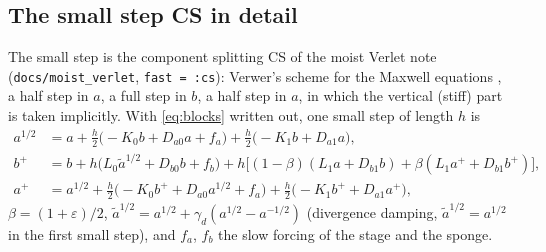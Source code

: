 \documentclass[11pt,a4paper]{article}
\newcommand{\code}[1]{\texttt{#1}}
\begin{document}
\subsection{The small step CS in detail}\label{sec:csdetail}
The small step is the component splitting CS of the moist Verlet note (\code{docs/moist\_verlet}, \code{fast = :cs}):
Verwer's scheme for the Maxwell equations \cite{verwer}, a half step in $a$, a full step in $b$, a half step in $a$, in
which the vertical (stiff) part is taken implicitly. With \eqref{eq:blocks} written out, one small step of length $h$ is
\begin{align}
a^{1/2}&=a+\tfrac h2\big(-K_0b+D_{a0}a+f_a\big)+\tfrac h2\big(-K_1b+D_{a1}a\big),\nonumber\\
b^{+}&=b+h\big(L_0\tilde a^{1/2}+D_{b0}b+f_b\big)+h\big[(1-\beta)(L_1a+D_{b1}b)+\beta(L_1a^++D_{b1}b^+)\big],\label{eq:csdg}\\
a^{+}&=a^{1/2}+\tfrac h2\big(-K_0b^++D_{a0}a^{1/2}+f_a\big)+\tfrac h2\big(-K_1b^++D_{a1}a^+\big),\nonumber
\end{align}
$\beta=(1+\varepsilon)/2$, $\tilde a^{1/2}=a^{1/2}+\gamma_d(a^{1/2}-a^{-1/2})$ (divergence damping, $\tilde a^{1/2}=a^{1/2}$ in the first
small step), and $f_a$, $f_b$ the slow forcing of the stage and the sponge.
\end{document}
